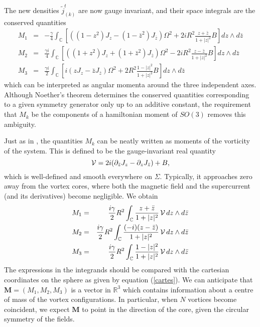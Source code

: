 \documentclass[a4paper,11pt]{article}
\begin{document}
The new densities $\tilde{j}_{(k)}^{t}$ are now gauge invariant, and
their space integrals are the conserved quantities
\begin{eqnarray*}
M_{1}&=& -\frac{\gamma}{4}\int_{\mathbb{C}}\left[\left( 
(1-z^{2})J_{z}-(1-\bar{z}^{2})J_{\bar{z}}\right)\Omega^{2}
+2iR^{2}\frac{z+\bar{z}}{1+|z|^{2}}B
\right] dz\wedge d\bar{z} \\
M_{2}&=&\frac{\gamma i}{4}\int_{\mathbb{C}}\left[\left(
(1+z^{2})J_{z}+ (1+\bar{z}^{2})J_{\bar{z}}\right)\Omega^{2}
-2iR^{2}\frac{z-\bar{z}}{1+|z|^{2}}B\right] 
dz\wedge d\bar{z}\\
M_{3}&=&\frac{\gamma i}{2}\int_{\mathbb{C}}\left[ i\left(zJ_{z}-
\bar{z}J_{\bar{z}}\right)\Omega^{2}+
2R^{2}\frac{1-|z|^{2}}{1+|z|^{2}}B \right]
dz\wedge d\bar{z}
\end{eqnarray*}
which can be interpreted as angular momenta around the three
independent axes.
Although Noether's theorem determines the conserved 
quantities corresponding to a given symmetry generator only up to an 
additive constant, the requirement that $M_{k}$ be the components of a
hamiltonian moment of $SO(3)$ removes this ambiguity.


Just as in \cite{MNcl}, the quantities $M_{k}$ can be neatly written as
moments of the vorticity of the system. This is defined to be the 
gauge-invariant real quantity
\[
{\cal V}=2i(\partial_{\bar{z}}J_{z}-\partial_{z}J_{\bar{z}})+B,
\]
which is well-defined and smooth everywhere on $\Sigma$. Typically, it
approaches zero away from the vortex cores, where both the magnetic 
field and the supercurrent (and its derivatives) become negligible.
We obtain
\begin{eqnarray}
M_{1}&=&\frac{i\gamma}{2} R^{2}\int_{\mathbb{C}}
\frac{z+\bar{z}}{1+|z|^{2}} \,{\cal V}\,dz\wedge d\bar{z} \label{M1vort}\\
M_{2}&=&\frac{i\gamma}{2} R^{2}\int_{\mathbb{C}}
\frac{(-i)(z-\bar{z})}{1+|z|^{2}} \,{\cal V}\,dz\wedge d\bar{z} \label{M2vort}\\
M_{3}&=&\frac{i\gamma}{2} R^{2}\int_{\mathbb{C}}
\frac{1-|z|^{2}}{1+|z|^{2}}\, {\cal V}\,dz\wedge d\bar{z} \label{M3vort}
\end{eqnarray}
The expressions in the integrands should be compared with the cartesian
coordinates on the sphere as given by equation (\ref{cartes}). We can
anticipate that $\mathbf{M}=(M_{1}, M_{2}, M_{3})$ is a vector in 
$\mathbb{R}^{3}$ which contains information about a centre of mass 
of the vortex configurations.
In particular, when $N$ vortices become coincident, we expect $\mathbf{M}$ 
to point in the direction of the core, given the circular symmetry of
the fields. 
\end{document}
